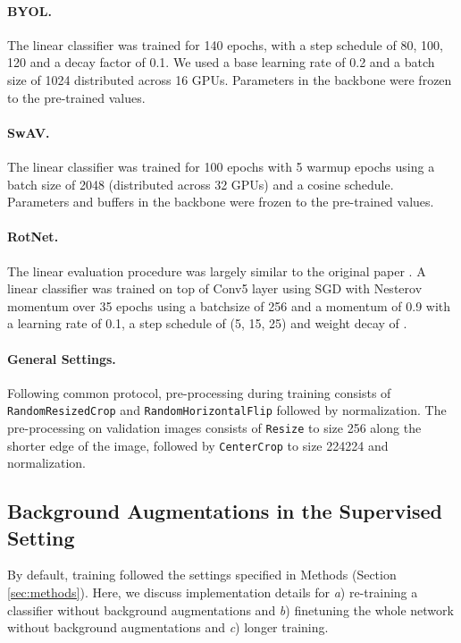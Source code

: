 \documentclass[twoside,11pt]{article}
\begin{document}
\paragraph{BYOL.} The linear classifier was trained for 140 epochs, with a step schedule of 80, 100, 120 and a decay factor of 0.1. We used a base learning rate of 0.2 and a batch size of 1024 distributed across 16 GPUs. Parameters in the backbone were frozen to the pre-trained values.

\paragraph{SwAV.} The linear classifier was trained for 100 epochs with 5 warmup epochs using a batch size of 2048 (distributed across 32 GPUs) and a cosine schedule. Parameters and buffers in the backbone were frozen to the pre-trained values.

\paragraph{RotNet.} The linear evaluation procedure  was largely similar to the original paper \citep{gidaris2018unsupervised}. A linear classifier was trained on top of Conv5 layer using SGD with Nesterov momentum over 35 epochs using a batchsize of 256 and a momentum of 0.9 with a learning rate of 0.1, a step schedule of (5, 15, 25) and weight decay of .  

\paragraph{General Settings.} Following common protocol, pre-processing during training consists of \texttt{RandomResizedCrop} and \texttt{RandomHorizontalFlip} followed by normalization. The pre-processing on validation images consists of \texttt{Resize} to size 256 along the shorter edge of the image, followed by \texttt{CenterCrop} to size 224224 and normalization.

\subsection{Background Augmentations in the Supervised Setting}

By default, training followed the settings specified in Methods (Section \ref{sec:methods}).  Here, we discuss implementation details for \textit{a}) re-training a classifier without background augmentations and \textit{b}) finetuning the whole network without background augmentations and \textit{c}) longer training.
\end{document}
